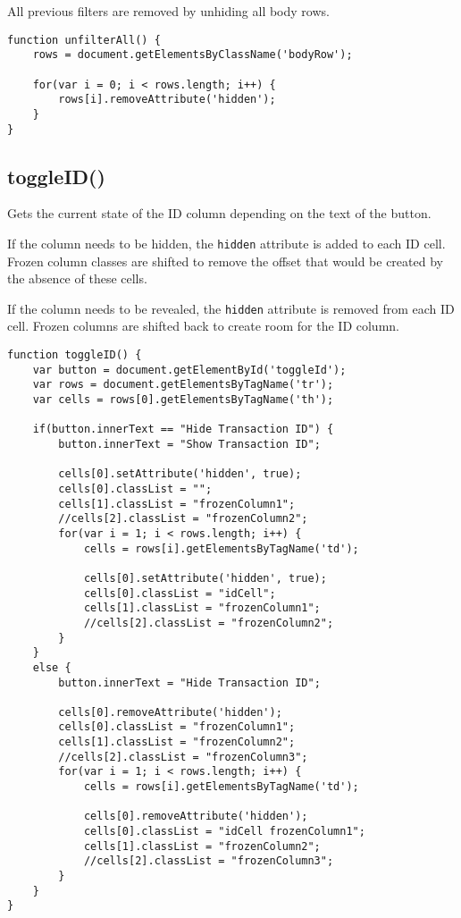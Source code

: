 \documentclass[letterpaper]{article}
\begin{document}
All previous filters are removed by unhiding all body rows.

\begin{lstlisting}[firstnumber=597]
function unfilterAll() {
    rows = document.getElementsByClassName('bodyRow');

    for(var i = 0; i < rows.length; i++) {
        rows[i].removeAttribute('hidden');
    }
}
\end{lstlisting}

\subsection{toggleID()}

Gets the current state of the ID column depending on the text of the button.

If the column needs to be hidden, the \lstinline{hidden} attribute is added to each ID cell.
Frozen column classes are shifted to remove the offset that would be created by the absence of these cells.

If the column needs to be revealed, the \lstinline{hidden} attribute is removed from each ID cell.
Frozen columns are shifted back to create room for the ID column.

\begin{lstlisting}[firstnumber=605]
function toggleID() {
    var button = document.getElementById('toggleId');
    var rows = document.getElementsByTagName('tr');
    var cells = rows[0].getElementsByTagName('th');

    if(button.innerText == "Hide Transaction ID") {
        button.innerText = "Show Transaction ID";

        cells[0].setAttribute('hidden', true);
        cells[0].classList = "";
        cells[1].classList = "frozenColumn1";
        //cells[2].classList = "frozenColumn2";
        for(var i = 1; i < rows.length; i++) {
            cells = rows[i].getElementsByTagName('td');

            cells[0].setAttribute('hidden', true);
            cells[0].classList = "idCell";
            cells[1].classList = "frozenColumn1";
            //cells[2].classList = "frozenColumn2";
        }
    }
    else {
        button.innerText = "Hide Transaction ID";

        cells[0].removeAttribute('hidden');
        cells[0].classList = "frozenColumn1";
        cells[1].classList = "frozenColumn2";
        //cells[2].classList = "frozenColumn3";
        for(var i = 1; i < rows.length; i++) {
            cells = rows[i].getElementsByTagName('td');

            cells[0].removeAttribute('hidden');
            cells[0].classList = "idCell frozenColumn1";
            cells[1].classList = "frozenColumn2";
            //cells[2].classList = "frozenColumn3";
        }
    }
}
\end{lstlisting}
\end{document}
